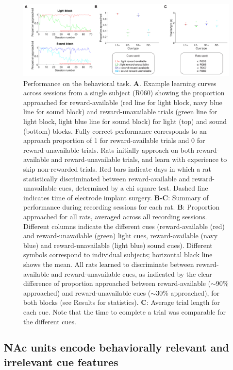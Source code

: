 \documentclass[11pt]{article}
\newcommand{\bsf}[1]{\textbf{#1}}
\providecommand{\DIFaddbeginFL}{} %
\providecommand{\DIFaddendFL}{} %
\providecommand{\DIFdelbeginFL}{} %
\providecommand{\DIFdelendFL}{} %
\newcommand{\DIFscaledelfig}{0.5}
\newlength{\DIFdelgraphicswidth} %
\newlength{\DIFdelgraphicsheight} %
\newcommand{\DIFaddincludegraphics}[2][]{{\color{blue}\fbox{\DIFOincludegraphics[#1]{#2}}}} %
\newcommand{\DIFdelincludegraphics}[2][]{%
\sbox{\DIFdelgraphicsbox}{\DIFOincludegraphics[#1]{#2}}%
\settoboxwidth{\DIFdelgraphicswidth}{\DIFdelgraphicsbox} %
\settoboxtotalheight{\DIFdelgraphicsheight}{\DIFdelgraphicsbox} %
\scalebox{\DIFscaledelfig}{%
\parbox[b]{\DIFdelgraphicswidth}{\usebox{\DIFdelgraphicsbox}\\[-\baselineskip] \rule{\DIFdelgraphicswidth}{0em}}\llap{\resizebox{\DIFdelgraphicswidth}{\DIFdelgraphicsheight}{%
\setlength{\unitlength}{\DIFdelgraphicswidth}%
\begin{picture}(1,1)%
\thicklines\linethickness{2pt} %
{\color[rgb]{1,0,0}\put(0,0){\framebox(1,1){}}}%
{\color[rgb]{1,0,0}\put(0,0){\line( 1,1){1}}}%
{\color[rgb]{1,0,0}\put(0,1){\line(1,-1){1}}}%
\end{picture}%
}\hspace*{3pt}}} %
} %
\DeclareRobustCommand{\DIFaddbeginFL}{\DIFOaddbeginFL \let\includegraphics\DIFaddincludegraphics} %
\DeclareRobustCommand{\DIFaddendFL}{\DIFOaddendFL \let\includegraphics\DIFOincludegraphics} %
\DeclareRobustCommand{\DIFdelbeginFL}{\DIFOdelbeginFL \let\includegraphics\DIFdelincludegraphics} %
\DeclareRobustCommand{\DIFdelendFL}{\DIFOaddendFL \let\includegraphics\DIFOincludegraphics} %
\begin{document}
 \begin{figure}[ht!]
\centering
\DIFdelbeginFL %
\DIFdelendFL \DIFaddbeginFL \includegraphics[width=\textwidth]{Fig 3 - Behavioral results.pdf}
\DIFaddendFL \caption{Performance on the behavioral task. \bsf{A}. Example learning curves
across sessions from a single subject (R060) showing the proportion approached
for reward-available (red line for light block, navy blue line for sound
block) and reward-unavailable trials (green line for light block, light blue
line for sound block) for light (top) and sound (bottom) blocks. Fully correct performance corresponds to an approach
proportion of 1 for reward-available trials and 0 for reward-unavailable
trials. Rats initially approach on both reward-available and
reward-unavailable trials, and learn with experience to skip non-rewarded
trials. Red bars indicate days in which a rat statistically discriminated
between reward-available and reward-unavailable cues, determined by a chi
square test. Dashed line indicates time of electrode implant
surgery. \bsf{B-C}: Summary of performance during recording sessions for each
rat. \bsf{B}: Proportion approached for all rats, averaged across all
recording sessions. Different columns indicate the different cues
(reward-available (red) and reward-unavailable (green) light cues,
reward-available (navy blue) and reward-unavailable (light blue) sound
cues). Different symbols correspond to individual subjects; horizontal black
line shows the mean. All rats learned to discriminate between reward-available
and reward-unavailable cues, as indicated by the clear difference of
proportion approached between reward-available ($\sim$90\% approached) and
reward-unavailable cues ($\sim$30\% approached), for both blocks (see Results
for statistics). \bsf{C}: Average trial length for each cue. Note that the
time to complete a trial was comparable for the different cues.}
\label{fig:behav}
\end{figure} \clearpage

\subsection*{NAc units encode behaviorally relevant and irrelevant cue features}
\end{document}
